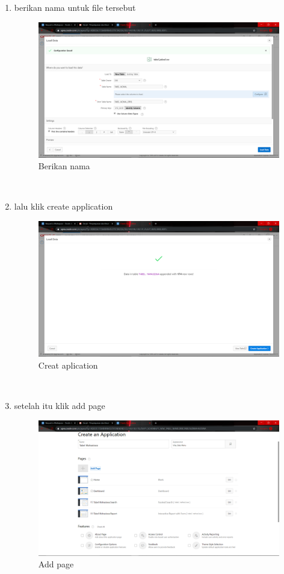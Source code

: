 \begin{enumerate}
\item berikan nama untuk file tersebut
\begin{figure}[H]
    \centering
    \includegraphics[scale=0.2]{figures/18}
    \caption{Berikan nama}
    \label{Environment4}
\end{figure} \\

\item lalu klik create application
\begin{figure}[H]
    \centering
    \includegraphics[scale=0.2]{figures/19}
    \caption{Creat aplication}
    \label{Environment5}
\end{figure} \\

\item setelah itu klik add page 
\begin{figure}[H]
    \centering
    \includegraphics[scale=0.2]{figures/20}
    \caption{Add page}
    \label{CLI}
\end{figure} \\



\end{enumerate}

